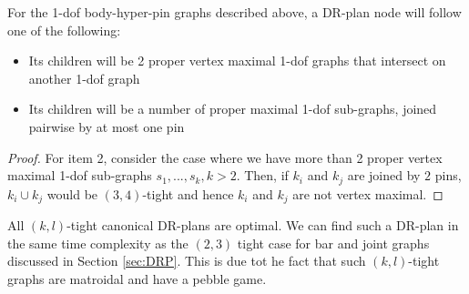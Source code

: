 \begin{observation}
    For the 1-dof body-hyper-pin graphs described above, a DR-plan node will follow one of the following:

    \begin{itemize}
        \item Its children will be 2 proper vertex maximal 1-dof graphs that intersect on another 1-dof graph
        \item Its children will be a number of proper maximal 1-dof sub-graphs, joined pairwise by at most one pin
    \end{itemize}
\end{observation}

\begin{proof}

    For item 2, consider the case where we have more than 2 proper vertex maximal 1-dof sub-graphs $s_1, ..., s_k, k > 2$. Then, if $k_i$ and $k_j$ are joined by $2$ pins, $k_i \cup k_j$ would be $(3,4)$-tight and hence $k_i$ and $k_j$ are not vertex maximal.
\end{proof}

\begin{remark}
\label{rem:1dofcanon}

    All $(k,l)$-tight canonical DR-plans are optimal. We can find such a DR-plan in the same time complexity as the $(2,3)$ tight case for bar and joint graphs discussed in Section \ref{sec:DRP}. This is due tot he fact that such $(k,l)$-tight graphs are matroidal and have a pebble game.
\end{remark}

